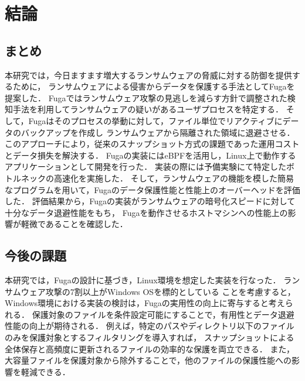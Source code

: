 \chapter{結論}
\label{chap:conclusion}
\section{まとめ}
本研究では，今日ますます増大するランサムウェアの脅威に対する防御を提供するために，
ランサムウェアによる侵害からデータを保護する手法としてFugaを提案した．
Fugaではランサムウェア攻撃の見逃しを減らす方針で調整された検知手法を利用してランサムウェアの疑いがあるユーザプロセスを特定する．
そして，Fugaはそのプロセスの挙動に対して，ファイル単位でリアクティブにデータのバックアップを作成し
ランサムウェアから隔離された領域に退避させる．
このアプローチにより，従来のスナップショット方式の課題であった運用コストとデータ損失を解決する．
Fugaの実装にはeBPFを活用し，Linux上で動作するアプリケーションとして開発を行った．
実装の際には予備実験にて特定したボトルネックの高速化を実施した．
そして，ランサムウェアの機能を模した簡易なプログラムを用いて，Fugaのデータ保護性能と性能上のオーバーヘッドを評価した．
評価結果から，Fugaの実装がランサムウェアの暗号化スピードに対して十分なデータ退避性能をもち，
Fugaを動作させるホストマシンへの性能上の影響が軽微であることを確認した．

\section{今後の課題}
本研究では，Fugaの設計に基づき，Linux環境を想定した実装を行なった．
ランサムウェア攻撃の7割以上がWindows OSを標的としている \cite{trendmicro-report} ことを考慮すると，
Windows環境における実装の検討は，Fugaの実用性の向上に寄与すると考えられる．
保護対象のファイルを条件設定可能にすることで，有用性とデータ退避性能の向上が期待される．
例えば，特定のパスやディレクトリ以下のファイルのみを保護対象とするフィルタリングを導入すれば，
スナップショットによる全体保存と高頻度に更新されるファイルの効率的な保護を両立できる．
また，大容量ファイルを保護対象から除外することで，他のファイルの保護性能への影響を軽減できる．


